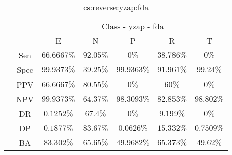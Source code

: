 \begin{table}[!ht]
	\centering
	\begin{tabular}{|c|c|c|c|c|c|c|}
		\cline{3-7}
		\multicolumn{2}{c|}{} & \multicolumn{5}{c|}{Class - yzap - fda} \\ \cline{3-7}
		\multicolumn{2}{c|}{} & E & N & P & R & T \\ \hline
		\multirow{7}{*}{\rotatebox{90}{Statistics}} & Sen & $66.6667\%$ & $92.05\%$ & $0\%$ & $38.786\%$ & $0\%$ \\ \cline{2-7}
		 & Spec & $99.9373\%$ & $39.25\%$ & $99.9363\%$ & $91.961\%$ & $99.24\%$ \\ \cline{2-7}
		 & PPV & $66.6667\%$ & $80.55\%$ & $0\%$ & $60\%$ & $0\%$ \\ \cline{2-7}
		 & NPV & $99.9373\%$ & $64.37\%$ & $98.3093\%$ & $82.853\%$ & $98.802\%$ \\ \cline{2-7}
		 & DR & $0.1252\%$ & $67.4\%$ & $0\%$ & $9.199\%$ & $0\%$ \\ \cline{2-7}
		 & DP & $0.1877\%$ & $83.67\%$ & $0.0626\%$ & $15.332\%$ & $0.7509\%$ \\ \cline{2-7}
		 & BA & $83.302\%$ & $65.65\%$ & $49.9682\%$ & $65.373\%$ & $49.62\%$ \\ \hline
	\end{tabular}
	\caption{cs:reverse:yzap:fda}
	\label{tab:cs:reverse:yzap:fda}
\end{table}
